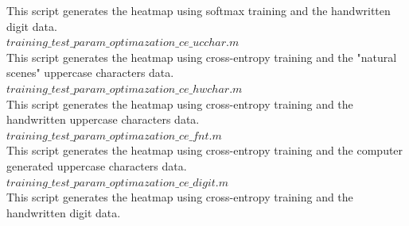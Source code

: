 \documentclass[journal,a4paper,onecolumn,11pt]{IEEEtran}
\begin{document}
This script generates the heatmap using softmax training and the handwritten digit data.\\
$training\_test\_param\_optimazation\_ce\_ucchar.m$\\
This script generates the heatmap using cross-entropy training and the "natural scenes" uppercase characters data.\\
$training\_test\_param\_optimazation\_ce\_hwchar.m$\\
This script generates the heatmap using cross-entropy training and the handwritten uppercase characters data.\\
$training\_test\_param\_optimazation\_ce\_fnt.m$\\
This script generates the heatmap using cross-entropy training and the computer generated uppercase characters data.\\
$training\_test\_param\_optimazation\_ce\_digit.m$\\
This script generates the heatmap using cross-entropy training and the handwritten digit data.\\

\pagebreak
\end{document}
